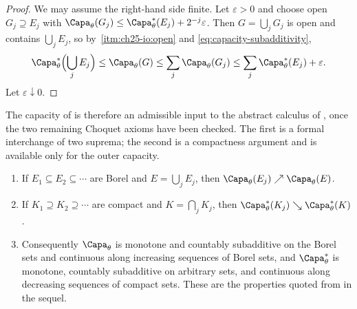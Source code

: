 \begin{proof}
We may assume the right-hand side finite.  Let \(\varepsilon>0\) and choose
open \(G_j\supseteq E_j\) with
\(\Capa_\theta(G_j)\leq\Capa_\theta^*(E_j)+2^{-j}\varepsilon\).  Then
\(G=\bigcup_jG_j\) is open and contains \(\bigcup_jE_j\), so by
\,\cref{itm:ch25-io:open} and
\eqref{eq:capacity-subadditivity},
\[
 \Capa^*_\theta\Bigl(\bigcup_jE_j\Bigr)\leq\Capa_\theta(G)
 \leq\sum_j\Capa_\theta(G_j)
 \leq\sum_j\Capa^*_\theta(E_j)+\varepsilon .
\]
Let \(\varepsilon\downarrow0\).
\end{proof}

The capacity of  is therefore an admissible input to
the abstract calculus of , once the two remaining
Choquet axioms have been checked.  The first is a formal interchange of two
suprema; the second is a compactness argument and is available only for the
outer capacity.

\begin{proposition}
\label{prop:ch25-choquet-axioms}
\begin{enumerate}
\item\label{itm:ch25-chq:incr}
 If \(E_1\subseteq E_2\subseteq\cdots\) are Borel and
 \(E=\bigcup_jE_j\), then
 \(\Capa_\theta(E_j)\nearrow\Capa_\theta(E)\).
\item\label{itm:ch25-chq:decr}
 If \(K_1\supseteq K_2\supseteq\cdots\) are compact and
 \(K=\bigcap_jK_j\), then
 \(\Capa^*_\theta(K_j)\searrow\Capa^*_\theta(K)\).
\item\label{itm:ch25-chq:choquet}
 Consequently \(\Capa_\theta\) is monotone and countably subadditive on the
 Borel sets and continuous along increasing sequences of Borel sets, and
 \(\Capa^*_\theta\) is monotone, countably subadditive on arbitrary sets,
 and continuous along decreasing sequences of compact sets.  These are the
 properties quoted from  in the sequel.
\end{enumerate}
\end{proposition}

